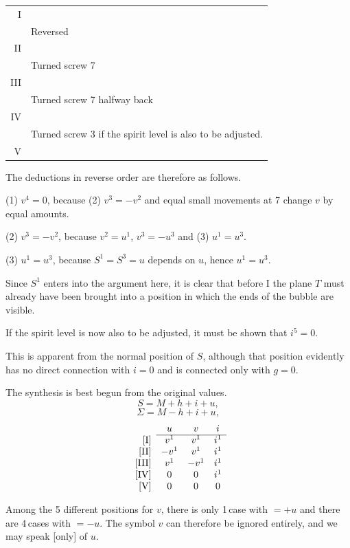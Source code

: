 \begin{center}
\begin{tabular}{r|p{.82\linewidth}}
I & \\
 & Reversed\\
II & \\
 & Turned screw 7\\
III & \\
 & Turned screw 7 halfway back\\
IV & \\
 & Turned screw 3 if the spirit level is also to be adjusted.\\
V &
\end{tabular}
\end{center}

The deductions in reverse order are therefore as follows.

(1) $v^4=0$, because (2) $v^3=-v^2$ and equal small movements at 7 change $v$ by equal amounts.

(2) $v^3=-v^2$, because $v^2=u^1$, $v^3=-u^3$ and (3) $u^1=u^3$.

(3) $u^1=u^3$, because $S^1=S^3=u$ depends on $u$, hence $u^1=u^3$.

Since $S^1$ enters into the argument here, it is clear that before I the plane $T$ must already have been brought into a position in which the ends of the bubble are visible.

If the spirit level is now also to be adjusted, it must be shown that $i^5=0$.

This is apparent from the normal position of $S$, although that position evidently has no direct connection with $i=0$ and is connected only with $g=0$.

The synthesis is best begun from the original values.
\[
S = M+h+i+u,
\]
\[
\Sigma = M-h+i+u,
\]
\[
\begin{array}{rccc}
 & u & v & i \\
\cline{2-4}
{[\mathrm{I}]} & v^1 & v^1 & i^1 \\
{[\mathrm{II}]} & -v^1 & v^1 & i^1 \\
{[\mathrm{III}]} & v^1 & -v^1 & i^1 \\
{[\mathrm{IV}]} & 0 & 0 & i^1 \\
{[\mathrm{V}]} & 0 & 0 & 0 \\
\end{array}
\]

Among the 5 different positions for $v$, there is only 1\,case with $=+u$ and there are 4\,cases with $=-u$. The symbol $v$ can therefore be ignored entirely, and we may speak [only] of $u$.

